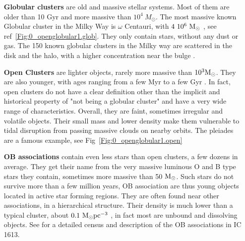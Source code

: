 \begin{itemize}


\item[\textbf{Globular clusters}] are old and massive stellar systems. Most of them are older than 10 Gyr and more massive than $10^4~M_\odot$. The most massive known Globular cluster in the Milky Way is $\omega$ Centauri, with $4~10^6~{\textrm{M}_\odot}$ \citep{Dsouza2013}, see ref~\ref{Fig:0_openglobular1.glob}. They only contain stars, without any dust or gas. The 150 known globular clusters in the Milky way are scattered in the disk and the halo, with a higher concentration near the bulge \citep{Harris1996}. 

\item[\textbf{Open Clusters}] are lighter objects, rarely more massive than $10^3 {\textrm{M}_\odot}$. They are also younger, with ages ranging from a few Myr to a few Gyr \citep{Dias2002}. In fact, open clusters do not have a clear definition other than the implicit and historical property of "not being a globular cluster" and have a very wide range of characteristics. Overall, they are faint, sometimes irregular and volatile objects. Their small mass and lower density make them vulnerable to tidal disruption from passing massive clouds on nearby orbits. The pleiades are a famous example, see Fig~\ref{Fig:0_openglobular1.open}

\item[\textbf{OB associations}] contain even less stars than open clusters, a few dozens in average. They get their name from the very massive luminous O and B type stars they contain, sometimes more massive than 50 ${\textrm{M}_\odot}$. Such stars do not survive more than a few million years, OB association are thus young objects located in active star forming regions. They are often found near other associations, in a hierarchical structure.  Their density is much lower than a typical cluster, about $0.1 ~{\textrm{M}_\odot} \textrm{pc}^{-3}$ \citep{Wright2014},  in fact most are unbound and dissolving objects. See \cite{Garcia2010} for a detailed census and description of the OB associations in IC 1613.


\end{itemize}

